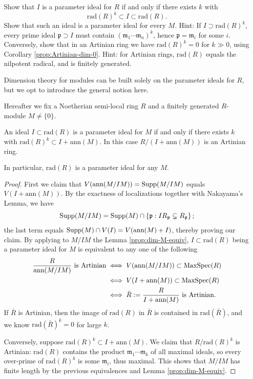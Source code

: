 \begin{exercise}
	Show that $I$ is a parameter ideal for $R$ if and only if there exists $k$ with
	\[ \text{rad}(R)^k \subset I \subset \text{rad}(R). \]
	Show that such an ideal is a parameter ideal for every $M$. Hint: If $I \supset \text{rad}(R)^k$, every prime ideal $\mathfrak{p} \supset I$ must contain $(\mathfrak{m}_1 \cdots \mathfrak{m}_n)^k$, hence $\mathfrak{p} = \mathfrak{m}_i$ for some $i$. Conversely, show that in an Artinian ring we have $\text{rad}(R)^k = 0$ for $k \gg 0$, using Corollary \ref{prop:Artinian-dim-0}. Hint: for Artinian rings, $\text{rad}(R)$ equals the nilpotent radical, and is finitely generated.
\end{exercise}

Dimension theory for modules can be built solely on the parameter ideals for $R$, but we opt to introduce the general notion here.

Hereafter we fix a Noetherian semi-local ring $R$ and a finitely generated $R$-module $M \neq \{0\}$.

\begin{lemma}\label{prop:para-ideal-characterization}
	An ideal $I \subset \mathrm{rad}(R)$ is a parameter ideal for $M$ if and only if there exists $k$ with $\mathrm{rad}(R)^k \subset I + \mathrm{ann}(M)$. In this case $R/(I+\mathrm{ann}(M))$ is an Artinian ring.
	
	In particular, $\mathrm{rad}(R)$ is a parameter ideal for any $M$.
\end{lemma}
\begin{proof}
	First we claim that $V(\text{ann}(M/IM)) = \operatorname{Supp}(M/IM)$ equals $V(I+\text{ann}(M))$. By the exactness of localizations together with Nakayama's Lemma, we have
	\[ \operatorname{Supp}(M/IM) = \operatorname{Supp}(M) \cap \left\{ \mathfrak{p}: IR_{\mathfrak{p}} \subsetneq R_{\mathfrak{p}} \right\}; \]
	the last term equals $\operatorname{Supp}(M) \cap V(I) = V(\text{ann}(M)+I)$, thereby proving our claim. By applying to $M/IM$ the Lemma \ref{prop:dim-M-equiv}, $I \subset \text{rad}(R)$ being a parameter ideal for $M$ is equivalent to any one of the following
	\begin{align*}
		\frac{R}{\text{ann}(M/IM)} \text{ is Artinian} & \iff V(\text{ann}(M/IM)) \subset \operatorname{MaxSpec}(R) \\
		& \iff V(I+\text{ann}(M)) \subset \operatorname{MaxSpec}(R) \\
		& \iff \bar{R} := \frac{R}{I+\text{ann}(M)} \text{ is Artinian}.
	\end{align*}
	If $\bar{R}$ is Artinian, then the image of $\text{rad}(R)$ in $\bar{R}$ is contained in $\text{rad}(\bar{R})$, and we know $\text{rad}(\bar{R})^k = 0$ for large $k$.
	
	Conversely, suppose $\text{rad}(R)^k \subset I + \text{ann}(M)$. We claim that $R/\text{rad}(R)^k$ is Artinian: $\mathrm{rad}(R)$ contains the product $\mathfrak{m}_1 \cdots \mathfrak{m}_k$ of all maximal ideals, so every over-prime of $\text{rad}(R)^k$ is some $\mathfrak{m}_i$, thus maximal. This shows that $M/IM$ has finite length by the previous equivalences and Lemma \ref{prop:dim-M-equiv}.
\end{proof}

